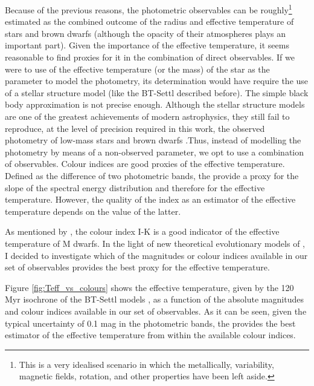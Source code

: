 Because of the previous reasons, the photometric observables can be roughly\footnote{This is a very idealised scenario in which the metallically, variability, magnetic fields, rotation, and other properties have been left aside.} estimated as the combined outcome of the radius and effective temperature of stars and brown dwarfs (although the opacity of their atmospheres plays an important part). Given the importance of the effective temperature, it seems reasonable to find proxies for it in the combination of direct observables. If we were to use of the effective temperature (or the mass) of the star as the parameter to model the photometry, its determination would have require the use of a stellar structure model (like the BT-Settl described before). The simple black body approximation is not precise enough. Although the stellar structure models are one of the greatest achievements of modern astrophysics, they still fail to reproduce, at the level of precision required in this work, the observed photometry of low-mass stars and brown dwarfs \cite[see Fig. \ref{fig:HDRvsCMD}, and for example ][]{Bouy2015}.Thus, instead of modelling the photometry by means of a non-observed parameter, we opt to use a combination of observables. Colour indices are good proxies of the effective temperature. Defined as the difference of two photometric bands, the provide a proxy for the slope of the spectral energy distribution and therefore for the effective temperature.  However, the quality of the index as an estimator of the effective temperature depends on the value of the latter. 

As mentioned by \citet{1998A&A...333..231B}, the colour index I-K is a good indicator of the effective temperature of M dwarfs. In the light of new theoretical evolutionary models of \citet{2014IAUS..299..271A}, I decided to investigate which of the magnitudes or colour indices available in our set of observables provides the best proxy for the effective temperature. 

Figure \ref{fig:Teff_vs_colours} shows the effective temperature, given by the 120 Myr isochrone of the BT-Settl models \citep{2014IAUS..299..271A}, as a function of the absolute magnitudes and colour indices available in our set of observables. 
As it can be seen, given the typical uncertainty of 0.1 mag in the photometric bands, the  provides the best estimator of the effective temperature from within the available colour indices. 


